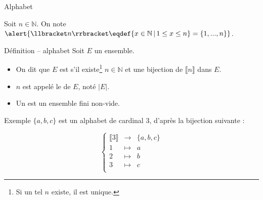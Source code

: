 
\begingroup

\begin{frame}{Alphabet}
  
  Soit $n\in \mathbb{N}$. On note $\alert{\llbracket n\rrbracket \eqdef \{x\in \mathbb{N} \,|\, 1 \le x \le n\} = \{1, ..., n\}}$.
  
  \begin{block}{Définition -- alphabet}
    Soit $E$ un ensemble.
    \begin{itemize}
    \item On dit que $E$ est  s'il existe\footnote[frame]{Si un tel $n$ existe, il est unique.} $n\in \mathbb{N}$ et une bijection de $\llbracket n\rrbracket$ dans $E$. 
    \item $n$ est appelé le  de $E$, noté \alert{$|E|$}.
    \item Un  est un \alert{ensemble fini non-vide}. 
    \end{itemize}
  \end{block}

  \begin{exampleblock}{Exemple}
    $\{a, b, c\}$ est un alphabet de cardinal 3, d'après la bijection suivante :

    $$
    \left\{\begin{array}{ccl}
    \llbracket 3\rrbracket &\rightarrow& \{a, b, c\}\\
    1 &\mapsto& a\\ 
    2 &\mapsto& b\\ 
    3 &\mapsto& c\\ 
    \end{array}\right.
    $$
  \end{exampleblock}

\end{frame}

\endgroup
